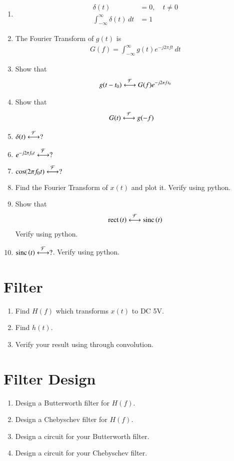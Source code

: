 \documentclass[journal,12pt,twocolumn]{IEEEtran}
\renewcommand\thesection{\arabic{section}}
\begin{document}
\begin{enumerate}[label=\thesection.\arabic*
,ref=\thesection.\theenumi]
\item 
	\begin{align}
		\delta(t)&=0, \quad t\neq0
\\
		\int_{-\infty}^{\infty}\delta(t) \, dt&= 1
	\end{align}
 \item The Fourier Transform of $g(t)$ is
 \begin{align}
 G(f)=\int_{-\infty}^{\infty}g(t)e^{-j2\pi ft}\,dt
 \end{align}
 \item Show that 
 \begin{align}
	 g(t-t_0)&\overset{\mathcal{F}}{ \longleftrightarrow}G(f)e^{-j2\pi ft_0}\\
 \end{align}
 \item Show that 
 \begin{align}
	 G(t)&\overset{\mathcal{F}}{ \longleftrightarrow}g(-f)
 \end{align}
 \item $\delta(t)\overset{\mathcal{F}}{ \longleftrightarrow}?$
 \item $e^{-j2\pi f_0t}\overset{\mathcal{F}}{ \longleftrightarrow}?$
 \item $\cos(2\pi f_0t)\overset{\mathcal{F}}{ \longleftrightarrow}?$
 \item Find the Fourier Transform of $x(t)$ and plot it.  Verify using python.
 \item Show that 
 \begin{align}
	 \text{rect}\left(t\right) \overset{\mathcal{F}}{ \longleftrightarrow} \text{sinc}\left(t\right)
 \end{align}
 Verify using python.
 \item 
$	 \text{sinc}\left(t\right)\overset{\mathcal{F}}{ \longleftrightarrow} ?$.  Verify using python.
\end{enumerate}
\section{Filter}
\begin{enumerate}[label=\thesection.\arabic*
,ref=\thesection.\theenumi]
\item Find $H(f)$ which transforms $x(t)$ to DC 5V.
\item Find $h(t)$.
\item Verify your result using  through convolution.
\end{enumerate}
\section{Filter Design}
\begin{enumerate}[label=\thesection.\arabic*
,ref=\thesection.\theenumi]
\item Design a Butterworth filter for $H(f)$.
\item Design a Chebyschev filter for $H(f)$.
\item Design a circuit for your Butterworth filter.
\item Design a circuit for your Chebyschev filter.
\end{enumerate}
\end{document}
